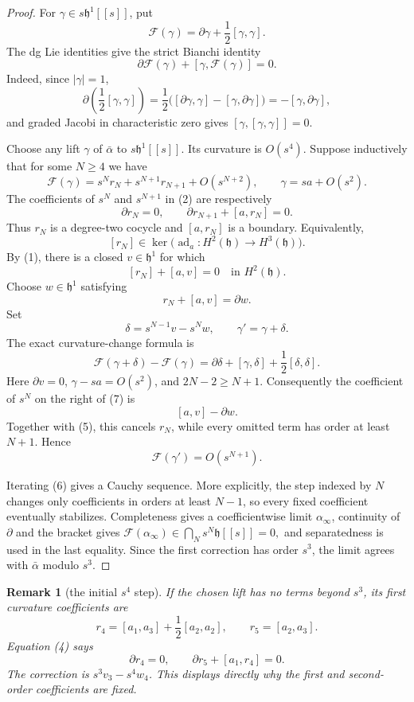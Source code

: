 \documentclass[11pt]{article}
\newtheorem{remark}[lemma]{Remark}
\newcommand{\ad}{\operatorname{ad}}
\begin{document}
\begin{proof}
For $\gamma\in s\mathfrak h^1[[s]]$, put
\[
 \mathcal F(\gamma)=\partial\gamma+\frac12[\gamma,\gamma].
\]
The dg Lie identities give the strict Bianchi identity
\[
 \partial\mathcal F(\gamma)+[\gamma,\mathcal F(\gamma)]=0.
 \tag{2}
\]
Indeed, since $|\gamma|=1$,
\[
 \partial\left(\frac12[\gamma,\gamma]\right)
 =\frac12\bigl([\partial\gamma,\gamma]-[\gamma,\partial\gamma]\bigr)
 =-[\gamma,\partial\gamma],
\]
and graded Jacobi in characteristic zero gives
$[\gamma,[\gamma,\gamma]]=0$.

Choose any lift $\gamma$ of $\bar\alpha$ to
$s\mathfrak h^1[[s]]$.  Its curvature is $O(s^4)$.  Suppose inductively that
for some $N\geq4$ we have
\[
 \mathcal F(\gamma)
 =s^N r_N+s^{N+1}r_{N+1}+O(s^{N+2}),
 \qquad \gamma=sa+O(s^2).
 \tag{3}
\]
The coefficients of $s^N$ and $s^{N+1}$ in (2) are respectively
\[
 \partial r_N=0,
 \qquad
 \partial r_{N+1}+[a,r_N]=0.
 \tag{4}
\]
Thus $r_N$ is a degree-two cocycle and
$[a,r_N]$ is a boundary.  Equivalently,
\[
 [r_N]\in
 \ker\bigl(\ad_a:H^2(\mathfrak h)\longrightarrow H^3(\mathfrak h)\bigr).
\]
By (1), there is a closed $v\in\mathfrak h^1$ for which
\[
 [r_N]+[a,v]=0\quad\text{in }H^2(\mathfrak h).
\]
Choose $w\in\mathfrak h^1$ satisfying
\[
 r_N+[a,v]=\partial w.                                      \tag{5}
\]
Set
\[
 \delta=s^{N-1}v-s^Nw,
 \qquad \gamma'=\gamma+\delta.                              \tag{6}
\]
The exact curvature-change formula is
\[
 \mathcal F(\gamma+\delta)-\mathcal F(\gamma)
 =\partial\delta+[\gamma,\delta]+\frac12[\delta,\delta].   \tag{7}
\]
Here $\partial v=0$, $\gamma-sa=O(s^2)$, and $2N-2\geq N+1$.
Consequently the coefficient of $s^N$ on the right of (7) is
\[
 [a,v]-\partial w.
\]
Together with (5), this cancels $r_N$, while every omitted term has order at
least $N+1$.  Hence
\[
 \mathcal F(\gamma')=O(s^{N+1}).
\]

Iterating (6) gives a Cauchy sequence.  More explicitly, the step indexed by
$N$ changes only coefficients in orders at least $N-1$, so every fixed
coefficient eventually stabilizes.  Completeness gives a coefficientwise
limit $\alpha_\infty$, continuity of $\partial$ and the bracket gives
\(
 \mathcal F(\alpha_\infty)\in\bigcap_Ns^N\mathfrak h[[s]]=0,
\)
and separatedness is used in the last equality.  Since the first correction
has order $s^3$, the limit agrees with $\bar\alpha$ modulo $s^3$.
\end{proof}

\begin{remark}[the initial $s^4$ step]
If the chosen lift has no terms beyond $s^3$, its first curvature
coefficients are
\[
 r_4=[a_1,a_3]+\frac12[a_2,a_2],
 \qquad r_5=[a_2,a_3].
\]
Equation (4) says
\[
 \partial r_4=0,
 \qquad \partial r_5+[a_1,r_4]=0.
\]
The correction is $s^3v_3-s^4w_4$.  This displays directly why the first and
second-order coefficients are fixed.
\end{remark}
\end{document}
